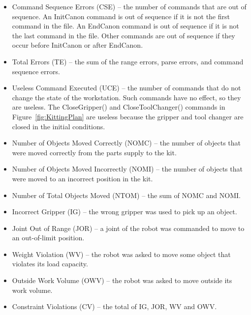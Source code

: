 \begin{itemize}
\item \sf Command Sequence Errors (CSE) \rm -- the number of commands that are
  out of sequence. An InitCanon command is out of sequence if it is not the
  first command in the file. An EndCanon command is out of sequence if it
  is not the last command in the file. Other commands are out of sequence
  if they occur before InitCanon or after EndCanon.\\

\item \sf Total Errors (TE) \rm -- the sum of the range errors, parse errors,
  and command sequence errors.\\

\item \sf Useless Command Executed (UCE) \rm -- the number of commands that do
  not change the state of the workstation. Such commands have no effect, so
  they are useless. The \sf CloseGripper() \rm and \sf CloseToolChanger()
  \rm commands in Figure~\ref{fig:KittingPlan} are useless because the
  gripper and tool changer are closed in the initial conditions.\\

\item \sf Number of Objects Moved Correctly (NOMC) \rm -- the number of objects
  that were moved correctly from the parts supply to the kit.\\

\item \sf Number of Objects Moved Incorrectly (NOMI) \rm -- the number of objects
  that were moved to an incorrect position in the kit.\\

\item \sf Number of Total Objects Moved (NTOM) \rm -- the sum of NOMC and NOMI.\\

\item \sf Incorrect Gripper (IG) \rm -- the wrong gripper was used to pick up an object.\\

\item \sf Joint Out of Range (JOR) \rm -- a joint of the robot was commanded to
  move to an out-of-limit position.\\

\item \sf Weight Violation (WV) \rm -- the robot was asked to move some object that
  violates its load capacity.\\

\item \sf Outside Work Volume (OWV) \rm -- the robot was asked to move outside its
  work volume.\\

\item \sf Constraint Violations (CV) \rm -- the total of IG, JOR, WV and OWV.

\end{itemize}

